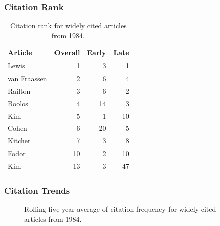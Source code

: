 \documentclass[
  10pt,
  letterpaper,
  DIV=11,
  numbers=noendperiod,
  twoside]{scrartcl}
\begin{document}
\subsubsection*{Citation Rank}\label{sec-rank-1984}

\begin{longtable}[]{@{}lrrr@{}}

\caption{\label{tbl-citation-rank-1984}Citation rank for widely cited
articles from 1984.}

\tabularnewline

\toprule\noalign{}
Article & Overall & Early & Late \\
\midrule\noalign{}
\endhead
\bottomrule\noalign{}
\endlastfoot
Lewis & 1 & 3 & 1 \\
van Fraassen & 2 & 6 & 4 \\
Railton & 3 & 6 & 2 \\
Boolos & 4 & 14 & 3 \\
Kim & 5 & 1 & 10 \\
Cohen & 6 & 20 & 5 \\
Kitcher & 7 & 3 & 8 \\
Fodor & 10 & 2 & 10 \\
Kim & 13 & 3 & 47 \\

\end{longtable}

\subsubsection*{Citation Trends}\label{sec-trends-1984}

\begin{figure}


\caption{\label{fig-citation-spaghetti-1984}Rolling five year average of
citation frequency for widely cited articles from 1984.}

\end{figure}%
\end{document}
